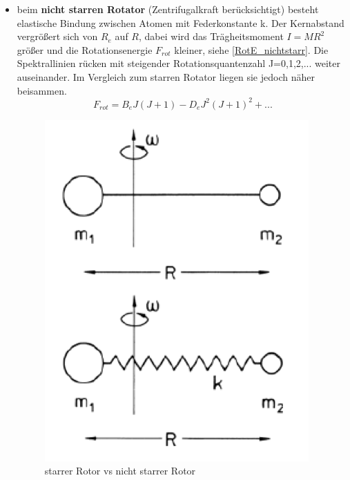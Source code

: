 \begin{itemize}
\begin{itemize}
            \item beim \textbf{nicht starren Rotator} (Zentrifugalkraft berücksichtigt) besteht elastische Bindung zwischen Atomen mit Federkonstante k. Der Kernabstand vergrößert sich von $R_e$ auf $R$, dabei wird das Trägheitsmoment $I=MR^2$ größer und die Rotationsenergie $F_{rot}$ kleiner, siehe \ref{RotE_nichtstarr}. Die Spektrallinien rücken mit steigender Rotationsquantenzahl J=0,1,2,... weiter auseinander. Im Vergleich zum starren Rotator liegen sie jedoch näher beisammen.
                \begin{equation}
                   F_{rot}=B_eJ(J+1)-D_eJ^2(J+1)^2+...
                   \label{RotE_nichtstarr}
                    \end{equation}
    \begin{figure}[H]
    \centering
   \begin{minipage}[b]{.3\linewidth}
      \includegraphics[width=\linewidth]{resources/16-03-2012/StarrervsnichtstarrerRotor.png}
      \caption{starrer Rotor vs nicht starrer Rotor}

\end{minipage}
\end{figure}
\end{itemize}
\end{itemize}
